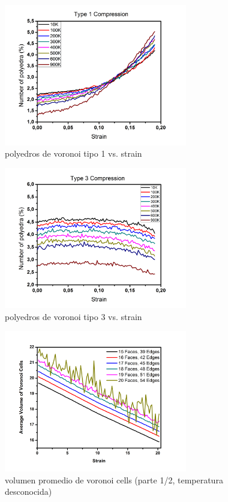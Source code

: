 \documentclass[10pt, oneside]{article} %
\begin{document}
\begin{figure}[H]
\centering
\includegraphics[width=8cm]{Figures/type1_COMP.png}
\caption{polyedros de voronoi tipo 1 vs. strain}
\end{figure}

\begin{figure}[H]
\centering
\includegraphics[width=8cm]{Figures/type3_COMP.png}
\caption{polyedros de voronoi tipo 3 vs. strain}
\end{figure}

\begin{figure}[H]
\centering
\includegraphics[width=8cm]{Figures/COMP_Vol_Step_A.png}
\caption{volumen promedio de voronoi cells (parte 1/2, temperatura desconocida)}
\end{figure}
\end{document}
